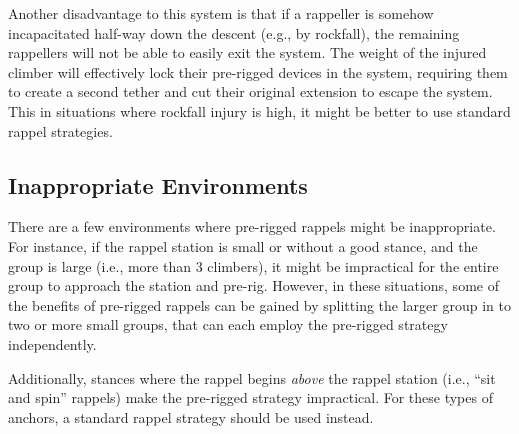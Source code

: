 \documentclass[nonacm,acmtog]{acmart}
\begin{document}
  Another disadvantage to this system is that if a rappeller is somehow
  incapacitated half-way down the descent (e.g., by rockfall), the remaining
  rappellers will not be able to easily exit the system.  The weight of the
  injured climber will effectively lock their pre-rigged devices in the system,
  requiring them to create a second tether and cut their original extension to
  escape the system.  This in situations where rockfall injury is high, it
  might be better to use standard rappel strategies.

\subsection{Inappropriate Environments}

   There are a few environments where pre-rigged rappels might be
   inappropriate.  For instance, if the rappel station is small or without a
   good stance, and the group is large (i.e., more than 3 climbers), it might
   be impractical for the entire group to approach the station and pre-rig.
   However, in these situations, some of the benefits of pre-rigged rappels can
   be gained by splitting the larger group in to two or more small groups, that
   can each employ the pre-rigged strategy independently.

   Additionally, stances where the rappel begins {\em above} the rappel station
   (i.e., ``sit and spin'' rappels) make the pre-rigged strategy impractical.
   For these types of anchors, a standard rappel strategy should be used
   instead.
\end{document}
